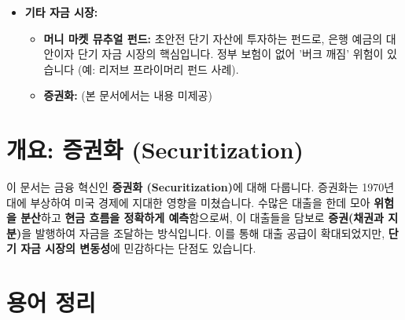\documentclass[11pt,a4paper]{article}
\begin{document}
\begin{tcolorbox}[summarybox, title=\textbf{모듈 1 핵심 요약: 금리 및 금융 시장}]
\begin{itemize}
\begin{itemize}
        \item \textbf{우상향 곡선:} 경제 확장 및 금리 인상 기대.
        \item \textbf{역전된 곡선:} 경기 침체 및 금리 인하 기대의 강력한 예측 지표.
    \end{itemize}
    \item \textbf{기타 자금 시장:}
    \begin{itemize}
        \item \textbf{머니 마켓 뮤추얼 펀드:} 초안전 단기 자산에 투자하는 펀드로, 은행 예금의 대안이자 단기 자금 시장의 핵심입니다. 정부 보험이 없어 '버크 깨짐' 위험이 있습니다 (예: 리저브 프라이머리 펀드 사례).
        \item \textbf{증권화:} (본 문서에서는 내용 미제공)
    \end{itemize}
\end{itemize}
\end{tcolorbox}

\newpage

\newpage
\section*{개요: 증권화 (Securitization)}

\begin{tcolorbox}[colback=myblue!10!white, colframe=myblue!75!black, title=\textbf{문서 핵심 요약}]
  이 문서는 금융 혁신인 \textbf{증권화 (Securitization)}에 대해 다룹니다.
  증권화는 1970년대에 부상하여 미국 경제에 지대한 영향을 미쳤습니다.
  수많은 대출을 한데 모아 \textbf{위험을 분산}하고 \textbf{현금 흐름을 정확하게 예측}함으로써,
  이 대출들을 담보로 \textbf{증권(채권과 지분)}을 발행하여 자금을 조달하는 방식입니다.
  이를 통해 대출 공급이 확대되었지만, \textbf{단기 자금 시장의 변동성}에 민감하다는 단점도 있습니다.
\end{tcolorbox}

\newpage
\section*{용어 정리}
\end{document}
